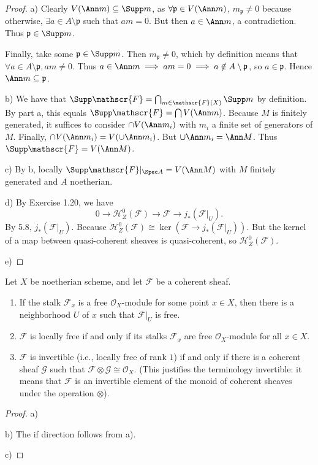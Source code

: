 \begin{proof}
	a)
	Clearly $V(\Ann m) \subseteq \Supp m$, as $\forall \mathfrak{p} \in V(\Ann m) $, $m_{\mathfrak{p}} \ne 0 $ because otherwise, $\exists a \in A\setminus \mathfrak{p} $ such that $am = 0 $.
	But then $a \in \Ann m $, a contradiction.
	Thus $\mathfrak{p} \in \Supp m $.

	Finally, take some $\mathfrak{p} \in \Supp m $.
	Then $m_{\mathfrak{p}} \ne 0 $, which by definition means that $\forall a \in A\setminus \mathfrak{p}, am \ne 0 $.
	Thus $a \in \Ann m \implies am = 0 \implies a \notin A \setminus \mathfrak{p} $, so $a \in \mathfrak{p} $.
	Hence $\Ann m \subseteq \mathfrak{p} $.

	b) We have that $\Supp \mathscr{F} = \bigcap_{m \in \mathscr{F}(X)} \Supp m $ by definition.
	By part a, this equals $\Supp \mathscr{F} = \bigcap V(\Ann m) $.
	Because $M $ is finitely generated, it suffices to consider $\cap V(\Ann m_i) $ with $m_i $ a finite set of generators of $M $.
	Finally, $\cap V(\Ann m_i) = V(\cup \Ann m_i) $.
	But $\cup \Ann m_i = \Ann M $.
	Thus $\Supp \mathscr{F} = V(\Ann M) $.

	c) By b, locally $\Supp \mathscr{F}|_{\Spec A} = V(\Ann M)$ with $M $ finitely generated and $A $ noetherian.

	d) By Exercise 1.20, we have
	\[
		0 \to \mathscr{H}_Z^0(\mathscr{F}) \to \mathscr{F} \to j_\ast(\mathscr{F}|_U)
	.\]
	By 5.8, $j_\ast(\mathscr{F}|_U) $.
	Because $\mathscr{H}_{Z}^0(\mathscr{F}) \cong \ker(\mathscr{F}\to j_\ast(\mathscr{F}|_U)) $.
	But the kernel of a map between quasi-coherent sheaves is quasi-coherent, so $\mathscr{H}_Z^0(\mathscr{F}) $.

	e)
\end{proof}

\begin{exercise}%
	Let $X $ be noetherian scheme, and let $\mathscr{F} $ be a coherent sheaf.
	\begin{enumerate}
		\item If the stalk $\mathscr{F}_x $ is a free $\mathcal{O}_X $-module for some point $x\in X $, then there is a neighborhood $U $ of $x $ such that $\mathscr{F}|_U $ is free.
		\item $\mathscr{F} $ is locally free if and only if its stalks $\mathscr{F}_x $ are free $\mathcal{O}_X $-module for all $x \in X $.
		\item $\mathscr{F} $ is invertible (i.e., locally free of rank $1 $) if and only if there is a coherent sheaf $\mathscr{G} $ such that $\mathscr{F} \otimes \mathscr{G} \cong \mathcal{O}_X $. (This justifies the terminology invertible: it means that $\mathscr{F} $ is an invertible element of the monoid of coherent sheaves under the operation $\otimes $).
	\end{enumerate}
\end{exercise}
\begin{proof}
	a)

	b) The if direction follows from a).

	c)
\end{proof}

